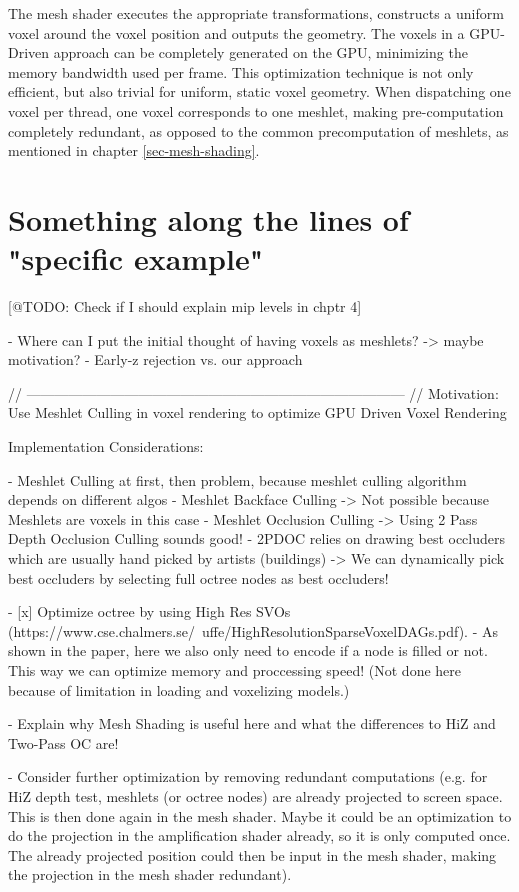 The mesh shader executes the appropriate transformations, constructs a uniform voxel around the voxel position 
and outputs the geometry. The voxels in a \ac{GPU}-Driven approach can be completely generated on the \ac{GPU}, 
minimizing the memory bandwidth used per frame. This optimization technique is not only efficient, but also 
trivial for uniform, static voxel geometry. When dispatching one voxel per thread, one voxel corresponds 
to one meshlet, making pre-computation completely redundant, as opposed to the common precomputation of meshlets, 
as mentioned in chapter \ref{sec-mesh-shading}. 


\section{Something along the lines of "specific example"} \label{sec-todo}

[@TODO: Check if I should explain mip levels in chptr 4]

- Where can I put the initial thought of having voxels as meshlets? -> maybe motivation? 
- Early-z rejection vs. our approach



// --------------------------------------------------------------------------------- //
Motivation:
Use Meshlet Culling in voxel rendering to optimize GPU Driven Voxel Rendering


Implementation Considerations:

- Meshlet Culling at first, then problem, because meshlet culling algorithm depends on different algos
    - Meshlet Backface Culling -> Not possible because Meshlets are voxels in this case
    - Meshlet Occlusion Culling -> Using 2 Pass Depth Occlusion Culling sounds good!
    - 2PDOC relies on drawing best occluders which are usually hand picked by artists (buildings)
        -> We can dynamically pick best occluders by selecting full octree nodes as best occluders!

- [x] Optimize octree by using High Res SVOs (https://www.cse.chalmers.se/~uffe/HighResolutionSparseVoxelDAGs.pdf).
    - As shown in the paper, here we also only need to encode if a node is filled or not. This way we can 
    optimize memory and proccessing speed! (Not done here because of limitation in loading and voxelizing models.)

- Explain why Mesh Shading is useful here and what the differences to HiZ and Two-Pass OC are!

- Consider further optimization by removing redundant computations (e.g. for HiZ depth test, meshlets (or octree nodes)
are already projected to screen space. This is then done again in the mesh shader. Maybe it could be an optimization 
to do the projection in the amplification shader already, so it is only computed once. The already projected position 
could then be input in the mesh shader, making the projection in the mesh shader redundant).

